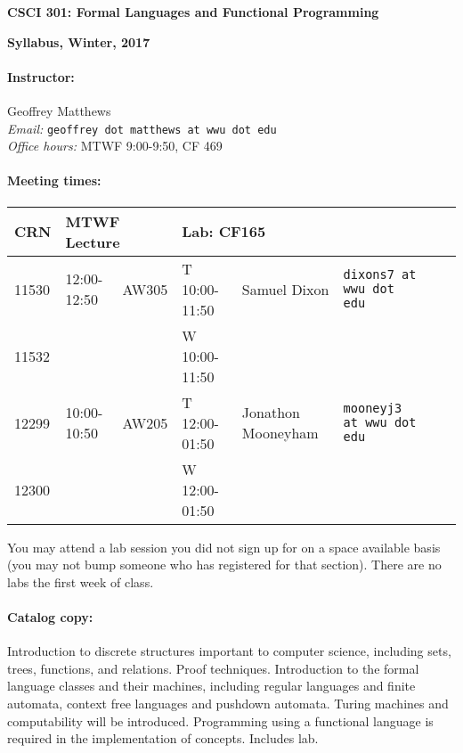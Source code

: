 \documentclass{article}
\begin{document}
\centerline{\Large\bf CSCI 301: Formal Languages and Functional Programming}
\centerline{\large\bf Syllabus, Winter, 2017}

\paragraph{Instructor:} Geoffrey Matthews\\
{\em Email:} {\tt geoffrey dot matthews at wwu dot edu}\\
{\em Office hours:} MTWF 9:00-9:50, CF 469

\paragraph{Meeting times:} \mbox{}

  \begin{tabular}{l|ll|lllll}
    CRN & \multicolumn{2}{l|}{MTWF Lecture}
    & \multicolumn{3}{l}{Lab: CF165}   \\\hline
    11530 &  12:00-12:50 & AW305 & T  10:00-11:50 
    & Samuel Dixon & {\tt dixons7 at wwu dot edu} \\
    11532 &  & & W  10:00-11:50 
    &&\\\hline
    12299 &  10:00-10:50 & AW205 & T  12:00-01:50 
    & Jonathon Mooneyham & {\tt mooneyj3 at wwu dot edu}\\
    12300 &  & & W  12:00-01:50 
    &&\\ 
    \end{tabular}
	
  You  may attend a
  lab session you did not sign up for on a space available
  basis (you may not bump someone who has registered for
  that section).  There are no labs the first week of class.

\paragraph{Catalog copy:} Introduction to discrete structures important to
  computer science, including sets, trees, functions, and
  relations. Proof techniques. Introduction to the formal language
  classes and their machines, including regular languages and finite
  automata, context free languages and pushdown automata. Turing
  machines and computability will be introduced. Programming using a
  functional language is required in the implementation of
  concepts. Includes lab.
\end{document}
